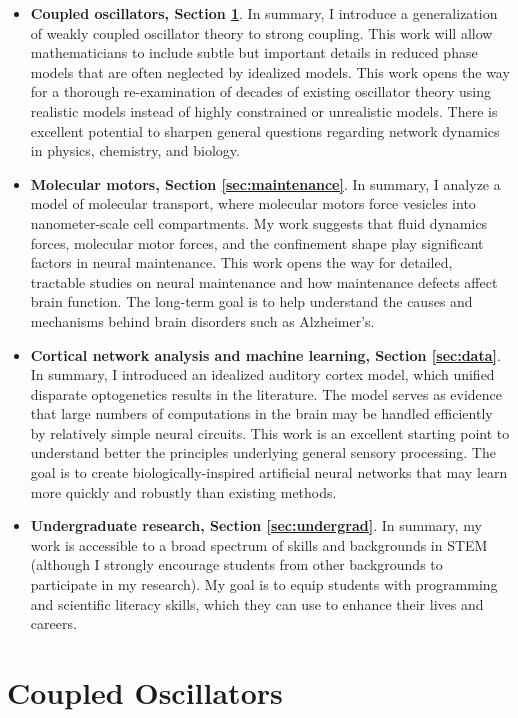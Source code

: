 \documentclass[a4paper,11pt]{article}
\begin{document}
	\begin{itemize}
		\item \textbf{Coupled oscillators, Section \ref{sec:interactions}}. In summary, I introduce a generalization of weakly coupled oscillator theory to strong coupling. This work will allow mathematicians to include subtle but important details in reduced phase models that are often neglected by idealized models. This work opens the way for a thorough re-examination of decades of existing oscillator theory using realistic models instead of highly constrained or unrealistic models. There is excellent potential to sharpen general questions regarding network dynamics in physics, chemistry, and biology.
		\item \textbf{Molecular motors, Section \ref{sec:maintenance}}. In summary, I analyze a model of molecular transport, where molecular motors force vesicles into nanometer-scale cell compartments. My work suggests that fluid dynamics forces, molecular motor forces, and the confinement shape play significant factors in neural maintenance. This work opens the way for detailed, tractable studies on neural maintenance and how maintenance defects affect brain function. The long-term goal is to help understand the causes and mechanisms behind brain disorders such as Alzheimer's.
		\item \textbf{Cortical network analysis and machine learning, Section \ref{sec:data}}. In summary, I introduced an idealized auditory cortex model, which unified disparate optogenetics results in the literature. The model serves as evidence that large numbers of computations in the brain may be handled efficiently by relatively simple neural circuits. This work is an excellent starting point to understand better the principles underlying general sensory processing. The goal is to create biologically-inspired artificial neural networks that may learn more quickly and robustly than existing methods.
		\item \textbf{Undergraduate research, Section \ref{sec:undergrad}}. In summary, my work is accessible to a broad spectrum of skills and backgrounds in STEM (although I strongly encourage students from other backgrounds to participate in my research). My goal is to equip students with programming and scientific literacy skills, which they can use to enhance their lives and careers.
	\end{itemize}
	
	\section{Coupled Oscillators}\label{sec:interactions}
	
\end{document}
